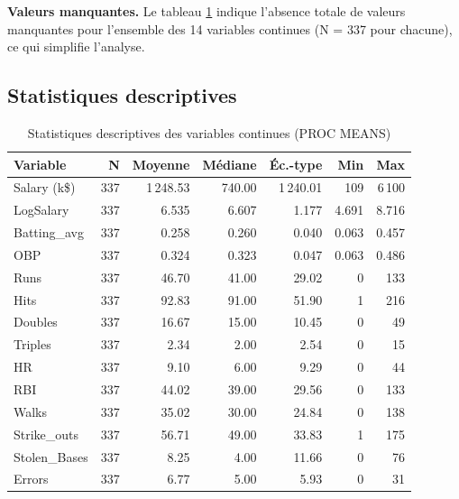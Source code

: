 \documentclass[11pt,a4paper]{article}
\begin{document}
\noindent\textbf{Valeurs manquantes.} Le tableau \ref{tab:means} indique l'absence
totale de valeurs manquantes pour l'ensemble des 14 variables continues (N = 337
pour chacune), ce qui simplifie l'analyse.

\subsection{Statistiques descriptives}

\begin{table}[H]
\centering
\caption{Statistiques descriptives des variables continues (PROC MEANS)}
\label{tab:means}
\small
\begin{tabular}{lrrrrrr}
\toprule
\textbf{Variable} & \textbf{N} & \textbf{Moyenne} & \textbf{Médiane}
  & \textbf{Éc.-type} & \textbf{Min} & \textbf{Max} \\
\midrule
Salary (k\$)    & 337 & 1\,248.53 & 740.00  & 1\,240.01 & 109    & 6\,100  \\
LogSalary       & 337 & 6.535     & 6.607   & 1.177     & 4.691  & 8.716   \\
Batting\_avg    & 337 & 0.258     & 0.260   & 0.040     & 0.063  & 0.457   \\
OBP             & 337 & 0.324     & 0.323   & 0.047     & 0.063  & 0.486   \\
Runs            & 337 & 46.70     & 41.00   & 29.02     & 0      & 133     \\
Hits            & 337 & 92.83     & 91.00   & 51.90     & 1      & 216     \\
Doubles         & 337 & 16.67     & 15.00   & 10.45     & 0      & 49      \\
Triples         & 337 & 2.34      & 2.00    & 2.54      & 0      & 15      \\
HR              & 337 & 9.10      & 6.00    & 9.29      & 0      & 44      \\
RBI             & 337 & 44.02     & 39.00   & 29.56     & 0      & 133     \\
Walks           & 337 & 35.02     & 30.00   & 24.84     & 0      & 138     \\
Strike\_outs    & 337 & 56.71     & 49.00   & 33.83     & 1      & 175     \\
Stolen\_Bases   & 337 & 8.25      & 4.00    & 11.66     & 0      & 76      \\
Errors          & 337 & 6.77      & 5.00    & 5.93      & 0      & 31      \\
\bottomrule
\end{tabular}
\end{table}
\end{document}
